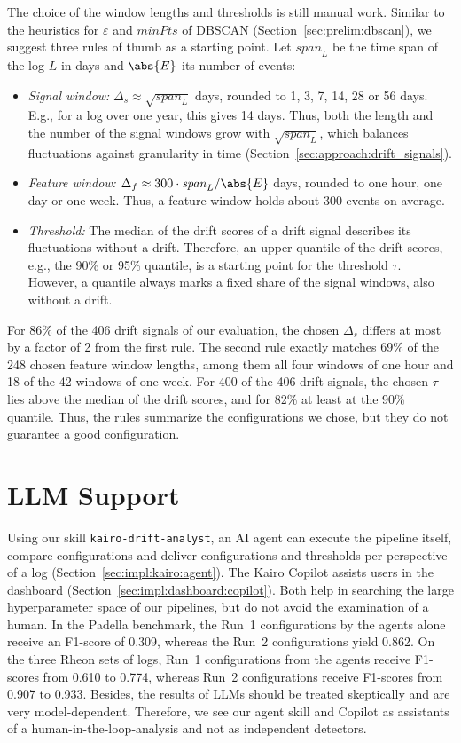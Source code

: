 The choice of the window lengths and thresholds is still manual work. Similar to the heuristics for $\varepsilon$ and $\mathit{minPts}$ of DBSCAN (Section~\ref{sec:prelim:dbscan}), we suggest three rules of thumb as a starting point. Let $\mathit{span}_L$ be the time span of the log $L$ in days and $\abs{E}$ its number of events:
\begin{itemize}
	\item \emph{Signal window:} $\Delta_s \approx \sqrt{\mathit{span}_L}$ days, rounded to 1, 3, 7, 14, 28 or 56 days. E.g., for a log over one year, this gives 14 days. Thus, both the length and the number of the signal windows grow with $\sqrt{\mathit{span}_L}$, which balances fluctuations against granularity in time (Section~\ref{sec:approach:drift_signals}).
	\item \emph{Feature window:} $\Delta_f \approx 300 \cdot \mathit{span}_L / \abs{E}$ days, rounded to one hour, one day or one week. Thus, a feature window holds about 300 events on average.
	\item \emph{Threshold:} The median of the drift scores of a drift signal describes its fluctuations without a drift. Therefore, an upper quantile of the drift scores, e.g., the 90\% or 95\% quantile, is a starting point for the threshold $\tau$. However, a quantile always marks a fixed share of the signal windows, also without a drift.
\end{itemize}
For 86\% of the 406 drift signals of our evaluation, the chosen $\Delta_s$ differs at most by a factor of 2 from the first rule. The second rule exactly matches 69\% of the 248 chosen feature window lengths, among them all four windows of one hour and 18 of the 42 windows of one week. For 400 of the 406 drift signals, the chosen $\tau$ lies above the median of the drift scores, and for 82\% at least at the 90\% quantile. Thus, the rules summarize the configurations we chose, but they do not guarantee a good configuration.

\section{LLM Support}
\label{sec:discussion:llm}
Using our skill \texttt{kairo-drift-analyst}, an AI agent can execute the pipeline itself, compare configurations and deliver configurations and thresholds per perspective of a log (Section~\ref{sec:impl:kairo:agent}). The Kairo Copilot assists users in the dashboard (Section~\ref{sec:impl:dashboard:copilot}). Both help in searching the large hyperparameter space of our pipelines, but do not avoid the examination of a human. In the Padella benchmark, the Run~1 configurations by the agents alone receive an F1-score of 0.309, whereas the Run~2 configurations yield 0.862. On the three Rheon sets of logs, Run~1 configurations from the agents receive F1-scores from 0.610 to 0.774, whereas Run~2 configurations receive F1-scores from 0.907 to 0.933. Besides, the results of LLMs should be treated skeptically and are very model-dependent. Therefore, we see our agent skill and Copilot as assistants of a human-in-the-loop-analysis and not as independent detectors.

